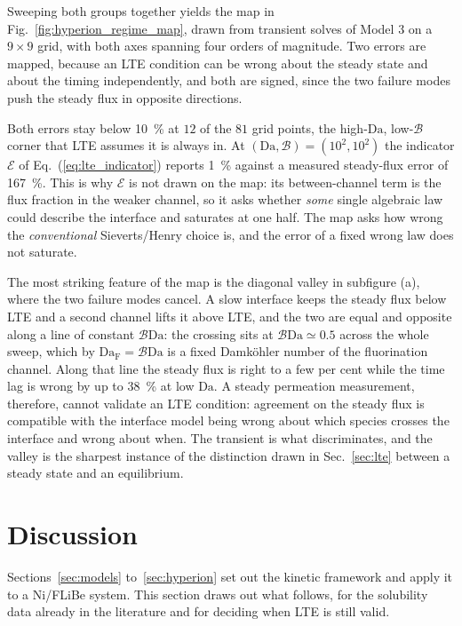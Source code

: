 \documentclass[5p]{elsarticle}
\newcommand{\Da}{\mathrm{Da}}
\newcommand{\Bra}{\mathcal{B}}             %
\begin{document}
Sweeping both groups together yields the map in Fig.~\ref{fig:hyperion_regime_map}, drawn from transient solves of Model 3 on a $9\times9$ grid, with both axes spanning four orders of magnitude.
Two errors are mapped, because an LTE condition can be wrong about the steady state and about the timing independently, and both are signed, since the two failure modes push the steady flux in opposite directions.

Both errors stay below \qty{10}{\percent} at $12$ of the $81$ grid points, the high-$\Da$, low-$\Bra$ corner that LTE assumes it is always in.
At $(\Da, \Bra) = (10^{2}, 10^{2})$ the indicator $\mathcal{E}$ of Eq.~(\ref{eq:lte_indicator}) reports \qty{1}{\percent} against a measured steady-flux error of \qty{167}{\percent}. 
This is why $\mathcal{E}$ is not drawn on the map: its between-channel term is the flux fraction in the weaker channel, so it asks whether \emph{some} single algebraic law could describe the interface and saturates at one half.
The map asks how wrong the \emph{conventional} Sieverts/Henry choice is, and the error of a fixed wrong law does not saturate.

The most striking feature of the map is the diagonal valley in subfigure (a), where the two failure modes cancel.
A slow interface keeps the steady flux below LTE and a second channel lifts it above LTE, and the two are equal and opposite along a line of constant $\Bra\Da$: the crossing sits at $\Bra\Da \simeq 0.5$ across the whole sweep, which by $\Da_\mathrm{F} = \Bra\Da$ is a fixed Damk\"ohler number of the fluorination channel.
Along that line the steady flux is right to a few per cent while the time lag is wrong by up to \qty{38}{\percent} at low $\Da$.
A steady permeation measurement, therefore, cannot validate an LTE condition: agreement on the steady flux is compatible with the interface model being wrong about which species crosses the interface and wrong about when.
The transient is what discriminates, and the valley is the sharpest instance of the distinction drawn in Sec.~\ref{sec:lte} between a steady state and an equilibrium.

\section{Discussion}
\label{sec:discussion}

Sections~\ref{sec:models} to~\ref{sec:hyperion} set out the kinetic framework and apply it to a Ni/FLiBe system.
This section draws out what follows, for the solubility data already in the literature and for deciding when LTE is still valid.
\end{document}
